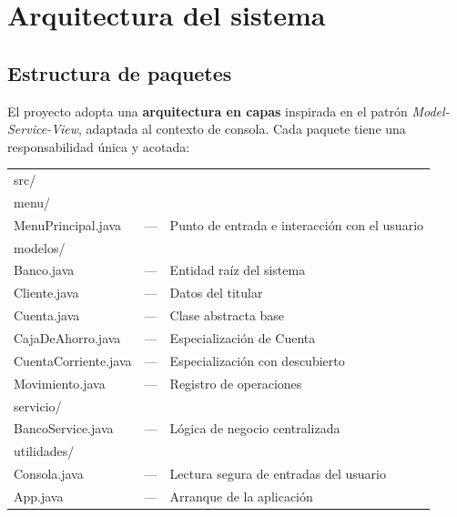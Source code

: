 \documentclass[12pt, a4paper]{article}
\begin{document}
\newpage
\section{Arquitectura del sistema}

\subsection{Estructura de paquetes}

El proyecto adopta una \textbf{arquitectura en capas} inspirada en el patrón
\textit{Model-Service-View}, adaptada al contexto de consola. Cada paquete
tiene una responsabilidad única y acotada:

\begin{center}
\begin{mdframed}[
  backgroundcolor=azulclaro,
  linecolor=azulucasal,
  linewidth=1pt,
  roundcorner=6pt,
  innerleftmargin=14pt,
  innerrightmargin=14pt,
  innertopmargin=10pt,
  innerbottommargin=10pt,
  userdefinedwidth=0.88\textwidth
]
\begin{tabularx}{\linewidth}{@{} l l X @{}}
  \ttfamily src/               &            & \\[2pt]
  \ttfamily \quad menu/        &            & \\
  \ttfamily \qquad MenuPrincipal.java  & \textrm{—} & \textrm{\small Punto de entrada e interacción con el usuario} \\[4pt]
  \ttfamily \quad modelos/     &            & \\
  \ttfamily \qquad Banco.java           & \textrm{—} & \textrm{\small Entidad raíz del sistema} \\
  \ttfamily \qquad Cliente.java         & \textrm{—} & \textrm{\small Datos del titular} \\
  \ttfamily \qquad Cuenta.java          & \textrm{—} & \textrm{\small Clase abstracta base} \\
  \ttfamily \qquad CajaDeAhorro.java    & \textrm{—} & \textrm{\small Especialización de Cuenta} \\
  \ttfamily \qquad CuentaCorriente.java & \textrm{—} & \textrm{\small Especialización con descubierto} \\
  \ttfamily \qquad Movimiento.java      & \textrm{—} & \textrm{\small Registro de operaciones} \\[4pt]
  \ttfamily \quad servicio/    &            & \\
  \ttfamily \qquad BancoService.java    & \textrm{—} & \textrm{\small Lógica de negocio centralizada} \\[4pt]
  \ttfamily \quad utilidades/  &            & \\
  \ttfamily \qquad Consola.java         & \textrm{—} & \textrm{\small Lectura segura de entradas del usuario} \\[4pt]
  \ttfamily App.java                    & \textrm{—} & \textrm{\small Arranque de la aplicación} \\
\end{tabularx}
\end{mdframed}
\end{center}
\end{document}
